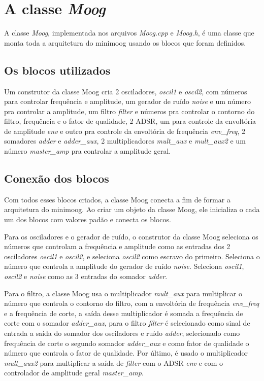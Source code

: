 \documentclass{article}
\begin{document}
\section{A classe \emph{Moog}}
A classe \emph{Moog}, implementada nos arquivos \emph{Moog.cpp} e \emph{Moog.h}, é uma classe que monta toda a arquitetura do minimoog usando os blocos que foram definidos.

\subsection{Os blocos utilizados}
Um construtor da classe Moog cria 2 osciladores, \emph{oscil1} e \emph{oscil2}, com números para controlar frequência e amplitude, um gerador de ruído \emph{noise} 
e um número pra controlar a amplitude, um filtro \emph{filter} e números pra controlar o contorno do filtro, frequência e o fator de qualidade, 2 ADSR, um para controle da 
envoltória de amplitude \emph{env} e outro pra controle da envoltória de frequência \emph{env\_freq}, 2 somadores \emph{adder} e \emph{adder\_aux}, 2 multiplicadores
\emph{mult\_aux} e \emph{mult\_aux2} e um número \emph{master\_amp} pra controlar a amplitude geral.

\subsection{Conexão dos blocos}
Com todos esses blocos criados, a classe Moog conecta a fim de formar a arquitetura do minimoog. Ao criar um objeto da classe Moog, ele inicializa 
o cada um dos blocos com valores padão e conecta os blocos.



Para os osciladores e o gerador de ruído, o construtor da classe Moog seleciona os números que controlam a frequência e amplitude como as entradas dos
2 osciladores \emph{oscil1} e \emph{oscil2}, e seleciona \emph{oscil2} como escravo do primeiro. Seleciona o número que controla a amplitude do gerador de 
ruído \emph{noise}. Seleciona \emph{oscil1}, \emph{oscil2} e \emph{noise} como as 3 entradas do somador \emph{adder}. 



Para o filtro, a classe Moog usa o multiplicador \emph{mult\_aux} para multiplicar o número que controla o contorno do filtro, com a envoltória de 
frequência \emph{env\_freq} e a frequência de corte, a saída desse multiplicador é somada a frequência de corte com o somador \emph{adder\_aux},
para o filtro \emph{filter} é selecionado como sinal de entrada a saída do somador dos osciladores e ruído \emph{adder}, selecionado como frequência 
de corte o segundo somador \emph{adder\_aux} e como fator de qualidade o número que controla o fator de qualidade. Por último, é usado o multiplicador 
\emph{mult\_aux2} para multiplicar a saída de \emph{filter} com o ADSR \emph{env} e com o controlador de amplitude geral \emph{master\_amp}. 
\end{document}
